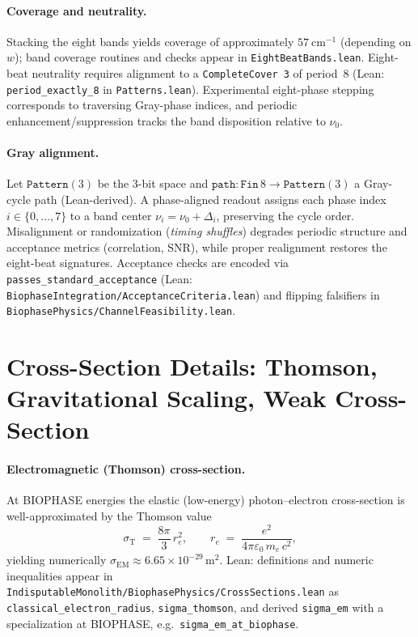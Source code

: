 \documentclass[12pt,a4paper]{article}
\begin{document}
\paragraph{Coverage and neutrality.}
Stacking the eight bands yields coverage of approximately \(57~\mathrm{cm}^{-1}\) (depending on \(w\)); band coverage routines and checks appear in \texttt{EightBeatBands.lean}. Eight-beat neutrality requires alignment to a \texttt{CompleteCover 3} of period~8 (Lean: \texttt{period\_exactly\_8} in \texttt{Patterns.lean}). Experimental eight-phase stepping corresponds to traversing Gray-phase indices, and periodic enhancement/suppression tracks the band disposition relative to \(\nu_0\).

\paragraph{Gray alignment.}
Let \(\texttt{Pattern}(3)\) be the 3-bit space and \(\texttt{path}:\texttt{Fin}\,8\to \texttt{Pattern}(3)\) a Gray-cycle path (Lean-derived). A phase-aligned readout assigns each phase index \(i\in\{0,\dots,7\}\) to a band center \(\nu_i=\nu_0+\Delta_i\), preserving the cycle order. Misalignment or randomization (\emph{timing shuffles}) degrades periodic structure and acceptance metrics (correlation, SNR), while proper realignment restores the eight-beat signatures. Acceptance checks are encoded via \texttt{passes\_standard\_acceptance} (Lean: \texttt{BiophaseIntegration/AcceptanceCriteria.lean}) and flipping falsifiers in \texttt{BiophasePhysics/ChannelFeasibility.lean}.

\section{Cross-Section Details: Thomson, Gravitational Scaling, Weak Cross-Section}
\label{app:cross-sections}

\paragraph{Electromagnetic (Thomson) cross-section.}
At BIOPHASE energies the elastic (low-energy) photon–electron cross-section is well-approximated by the Thomson value
\begin{equation}
  \sigma_{\mathrm{T}}
  \;=\;
  \frac{8\pi}{3}\,r_{e}^{2},
  \qquad
  r_{e}
  \;=\;
  \frac{e^{2}}{4\pi\varepsilon_{0}\,m_{e}\,c^{2}},
\end{equation}
yielding numerically
\(
  \sigma_{\mathrm{EM}}\approx 6.65\times 10^{-29}\,\mathrm{m}^{2}.
\)
Lean: definitions and numeric inequalities appear in
\texttt{IndisputableMonolith/BiophasePhysics/CrossSections.lean} as
\texttt{classical\_electron\_radius}, \texttt{sigma\_thomson}, and derived
\texttt{sigma\_em} with a specialization at BIOPHASE,
e.g.\ \texttt{sigma\_em\_at\_biophase}.
\end{document}
